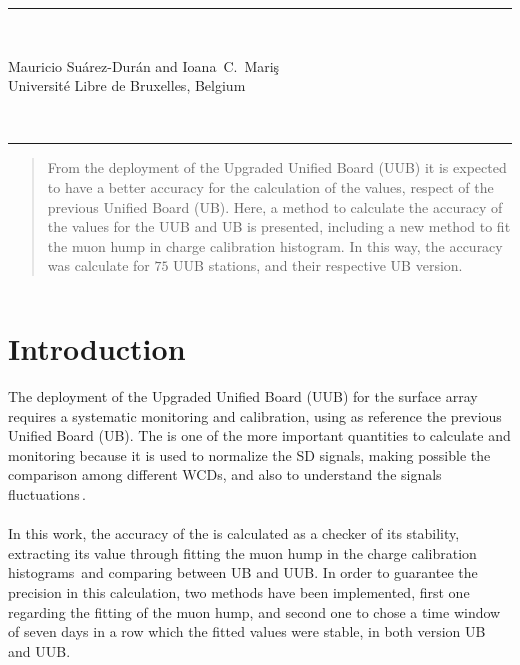 \documentclass[twoside, final, 10pt]{articleMine}
\begin{document}
\setpagewiselinenumbers
\modulolinenumbers[2]

\linenumbers

\renewcommand\linenumberfont{\small\rmfamily}
\begin{flushright}
\end{flushright}

\begin{flushright}
  \rule{\linewidth}{0.5mm}
  \\[17mm]
  \large
  \parbox[b]{15cm}
  {
    \begin{flushright}
      Mauricio Su\'arez-Dur\'an and  Ioana~C.~Mari\c{s}
      \\[6mm]
      {\small Universit{\'e} Libre de Bruxelles, Belgium}
    \end{flushright}
  }
  \\[5mm]
  \rule{\linewidth}{0.5mm}
\end{flushright}
%
%
\thispagestyle{empty}
\noindent

\begin{abstract}
  \noindent
  From the deployment of the Upgraded Unified Board (UUB) it is 
  expected to have a better accuracy for the calculation of the
  \qpkvem values, respect of the previous Unified Board (UB).
  Here, a method to calculate the accuracy of the \qpkvem values
  for the UUB and UB is presented, including a new method
  to fit the muon hump in charge calibration histogram. In this
  way, the accuracy was calculate for $75$ UUB stations, and
  their respective UB version.
\end{abstract}


\thispagestyle{empty}
$\;$
\noindent
\clearpage

\section{Introduction}
The deployment of the Upgraded Unified Board (UUB) for the
surface array\,\cite{augerPrimeDesign} requires a systematic
monitoring and calibration, using as reference the previous
Unified Board (UB). The \qpkvem is one of the more important
quantities to calculate and monitoring because it is used to
normalize the SD signals, making possible the comparison among
different WCDs, and also to understand the signals
fluctuations\,\cite{gap2003-030}.\\\\In this work, the accuracy
of the \qpkvem is calculated as a checker of its stability,
extracting its value through fitting the muon hump in the charge
calibration histograms\,\cite{BERTOU2006839} and comparing
between UB and UUB. In order to guarantee the precision in this
calculation, two methods have been implemented, first one
regarding the fitting of the muon hump, and second one to chose a
time window of seven days in a row which the fitted \qpkvem
values were stable, in both version UB and UUB.
\end{document}
